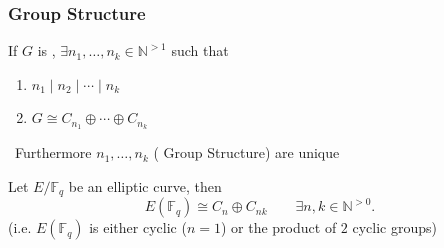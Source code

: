 \documentclass[10pt,handout]{beamer} %
\newcommand{\N}{\mathbb N}
\newcommand{\F}{\mathbb F}
\theoremstyle{definition}
\begin{document}
\begin{frame}%
 \frametitle{Group Structure}

\begin{theorem}
 If $G$ is {\color[rgb]{0.9,0.3,0.2}{abelian and finite}},  $\exists n_1,\ldots,n_k\in\N^{>1}$ such that
 \begin{enumerate}[<+-| alert@+>]
\item $n_1\mid n_2\mid\cdots\mid n_k$
\item $G\cong C_{n_1}\oplus\cdots\oplus C_{n_k}$
\end{enumerate}
\ \hfill Furthermore $n_1,\ldots,n_k$ ({\color[rgb]{0.9,0.3,0.2} Group Structure}) are unique
 \end{theorem}\pause


\begin{theorem} Let $E/\F_q$ be 
an elliptic curve, then
$$E(\F_q)\cong C_n\oplus C_{nk}\qquad\exists n,k\in\N^{>0}.$$
(i.e. $E(\F_q)$ is either cyclic ($n=1$) or the product of $2$ cyclic groups)
\pause
\end{theorem}            
\end{frame}
\end{document}
